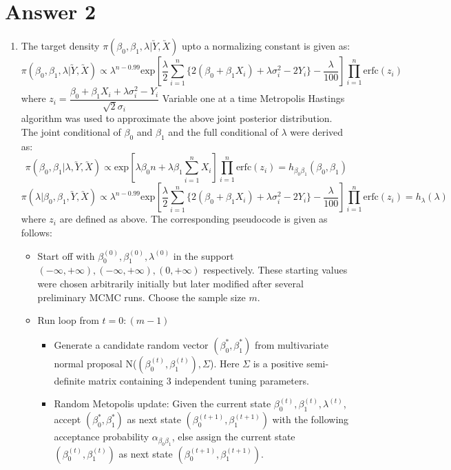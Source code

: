 \documentclass[12pt]{article}
\begin{document}
\section*{Answer 2}
\begin{enumerate}[label=(\alph*)]
\item The target density $\pi(\beta_0,\beta_1,\lambda|\utilde{Y},\utilde{X})$ upto a normalizing constant is given as:
\[\pi(\beta_0,\beta_1,\lambda|\utilde{Y},\utilde{X})\propto \lambda^{n-0.99}\text{exp}\left[\dfrac{\lambda}{2}\sum_{i=1}^{n}\{2(\beta_0+\beta_1 X_i)+\lambda\sigma_i^2-2Y_i\}-\dfrac{\lambda}{100}\right]\prod_{i=1}^{n}\text{erfc}(z_i)\]
where $z_i=\dfrac{\beta_0+\beta_1 X_i+\lambda\sigma_i^2-Y_i}{\sqrt{2}\sigma_i}$
Variable one at a time Metropolis Hastings algorithm was used to approximate the above joint posterior distribution. The joint conditional of $\beta_0$ and $\beta_1$ and the full conditional of $\lambda$ were derived as:
\[\pi(\beta_0,\beta_1|\lambda,\utilde{Y},\utilde{X})\propto\text{exp}\left[\lambda\beta_0 n+\lambda\beta_1 \sum_{i=1}^{n}X_i\right]\prod_{i=1}^{n}\text{erfc}(z_i)=h_{\beta_0\beta_1}(\beta_0,\beta_1)\]
\[\pi(\lambda|\beta_0,\beta_1,\utilde{Y},\utilde{X})\propto\lambda^{n-0.99}\text{exp}\left[\dfrac{\lambda}{2}\sum_{i=1}^{n}\{2(\beta_0+\beta_1 X_i)+\lambda\sigma_i^2-2Y_i\}-\dfrac{\lambda}{100}\right]\prod_{i=1}^{n}\text{erfc}(z_i)=h_{\lambda}(\lambda)\]
where $z_i$ are defined as above.
The corresponding pseudocode is given as follows:
\begin{itemize}
\item Start off with $\beta_0^{(0)},\beta_1^{(0)},\lambda^{(0)}$ in the support $(-\infty,+\infty),(-\infty,+\infty),(0,+\infty)$ respectively. These starting values were chosen arbitrarily initially but later modified after several preliminary MCMC runs. Choose the sample size $m$.
\item Run loop from $t=0:(m-1)$
\begin{itemize}
\item Generate a candidate random vector $(\beta_0^{*},\beta_1^{*})$ from multivariate normal proposal N($(\beta_0^{(t)},\beta_1^{(t)}),\Sigma$). Here $\Sigma$ is a positive semi-definite matrix containing 3 independent tuning parameters. 
\item Random Metopolis update: Given the current state $\beta_0^{(t)},\beta_1^{(t)},\lambda^{(t)}$, accept $(\beta_0^{*},\beta_1^{*})$ as next state $(\beta_0^{(t+1)},\beta_1^{(t+1)})$ with the following acceptance probability $\alpha_{\beta_0\beta_1}$, else assign the current state $(\beta_0^{(t)},\beta_1^{(t)})$  as next state $(\beta_0^{(t+1)},\beta_1^{(t+1)})$.

\end{itemize}
\end{itemize}
\end{enumerate}
\end{document}
